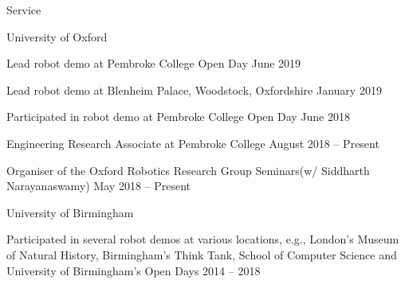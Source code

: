 
\begin{rSection}{Service}

\begin{rSubsection}{University of Oxford}{}{}{}
\item Lead robot demo at Pembroke College Open Day \hfill June 2019
\item Lead robot demo at Blenheim Palace, Woodstock, Oxfordshire \hfill January 2019
\item Participated in robot demo at Pembroke College Open Day \hfill June 2018
\item Engineering Research Associate at Pembroke College \hfill August 2018 -- Present
\item Organiser of the Oxford Robotics Research Group Seminars\newline (w/ Siddharth Narayanaswamy) \hfill May 2018 -- Present
\end{rSubsection}

\pagebreak

\begin{rSubsection}{University of Birmingham}{}{}{}
\item Participated in several robot demos at various locations, e.g., London's  Museum of Natural History, Birmingham's Think Tank,  School of  Computer Science and University of Birmingham's Open Days \hfill 2014 -- 2018
\end{rSubsection}




\end{rSection}
